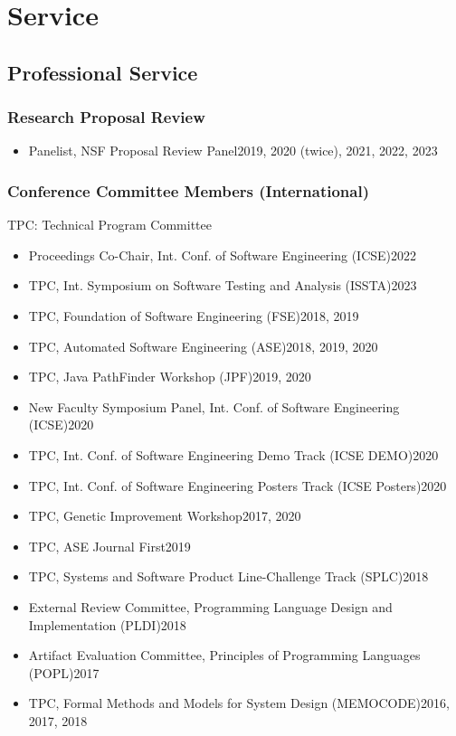 \documentclass[11pt]{article}
\begin{document}
\section{Service}
\subsection{Professional Service}

\subsubsection{Research Proposal Review}
\begin{itemize}
\item Panelist, NSF Proposal Review Panel\hfill 2019, 2020 (twice), 2021, 2022, 2023
\end{itemize}

\subsubsection{Conference Committee Members (International)}

\begin{description}[before=\small]
\item TPC: Technical Program Committee
\end{description}

\begin{itemize}
\item Proceedings Co-Chair,  Int. Conf. of Software Engineering (ICSE)\hfill 2022  
\item TPC,  Int. Symposium on Software Testing and Analysis (ISSTA)\hfill 2023
\item TPC, Foundation of Software Engineering (FSE)\hfill 2018, 2019 
\item TPC, Automated Software Engineering (ASE)\hfill 2018, 2019, 2020
\item TPC, Java PathFinder Workshop (JPF)\hfill 2019, 2020 
\item New Faculty Symposium Panel, Int. Conf. of Software Engineering (ICSE)\hfill 2020
\item TPC, Int. Conf. of Software Engineering Demo Track (ICSE DEMO)\hfill 2020
\item TPC, Int. Conf. of Software Engineering Posters Track (ICSE Posters)\hfill 2020
\item TPC, Genetic Improvement Workshop\hfill 2017, 2020 
\item TPC, ASE Journal First\hfill 2019
\item TPC, Systems and Software Product Line-Challenge Track (SPLC)\hfill 2018
\item External Review Committee, Programming Language Design and Implementation (PLDI)\hfill 2018
\item Artifact Evaluation Committee, Principles of Programming Languages (POPL)\hfill 2017
\item TPC, Formal Methods and Models for System Design (MEMOCODE)\hfill 2016, 2017, 2018
\end{itemize}
\end{document}
